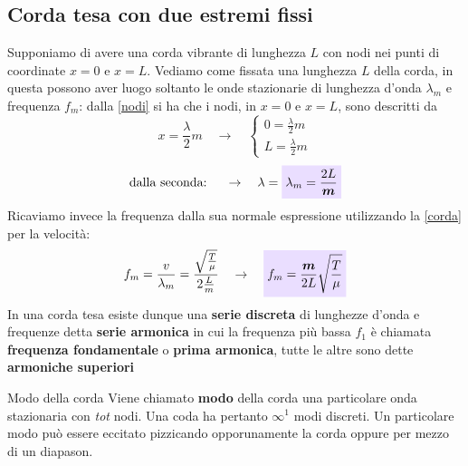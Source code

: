 \documentclass[x11names]{article}
\newcommand{\viola}[1]{\colorbox{myred}{$\displaystyle #1$}}
\begin{document}
		\subsection{Corda tesa con due estremi fissi}
		Supponiamo di avere una corda vibrante di lunghezza \(L\) con nodi nei punti di coordinate \(x=0\) e \(x=L\). Vediamo come fissata una lunghezza \(L\) della corda, in questa possono aver luogo soltanto le onde stazionarie di lunghezza d'onda \(\lambda_m\) e frequenza \(f_m\): dalla \ref{nodi} si ha che i nodi, in \(x=0\) e \(x=L\), sono descritti da
		\[ 
		x = \frac{\lambda}{2}m \quad \rightarrow \quad \begin{cases}
			0 = \frac{\lambda}{2}m\\ L = \frac{\lambda}{2}m
		\end{cases}
		\]
		\begin{equation}\label{lambdam}
			\text{dalla seconda: }\quad \to \quad \lambda = \viola{\lambda_m = \frac{2L}{\boldsymbol{m}}}
		\end{equation}
		Ricaviamo invece la frequenza dalla sua normale espressione utilizzando la \ref{corda} per la velocità:
		\[ 
		f_m = \frac{v}{\lambda_m} = \frac{\sqrt{\frac{T}{\mu}}}{2\frac{L}{m}} \quad \rightarrow \quad  \viola{f_m = \frac{\boldsymbol{m}}{2L}\sqrt{\frac{T}{\mu}}}
		\]
		In una corda tesa esiste dunque una \textbf{serie discreta} di lunghezze d'onda e frequenze detta \textbf{serie armonica} in  cui  la frequenza più bassa  \(f_1\) è chiamata \textbf{frequenza fondamentale} o \textbf{prima armonica}, tutte le altre sono dette \textbf{armoniche superiori}
		
		\begin{center}
			\colorbox{myblue}{\begin{minipage}{5.75in}
					\begin{blues}{Modo della corda}
						Viene chiamato \textbf{modo} della corda una particolare onda stazionaria con \textit{tot} nodi. Una coda ha pertanto \(\infty^1\) modi discreti. Un particolare modo può essere eccitato pizzicando opporunamente la corda oppure per mezzo di un diapason.
					\end{blues}
			\end{minipage}}
		\end{center}
		
\end{document}

